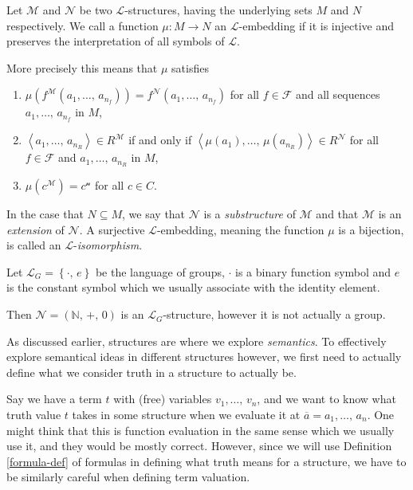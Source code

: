 \documentclass[../../main.tex]{subfiles}
\begin{document}
\begin{definition}\label{structure-embedding-def}\cite[Definition 1.1.3]{Mar02}
    Let $\mathcal{M}$ and $\mathcal{N}$ be two $\mathcal{L}$-structures, having the underlying sets $M$ and $N$ respectively.
    We call a function $\mu: M \to N$ an $\mathcal{L}$-embedding if it is injective and preserves the interpretation of all symbols of $\mathcal{L}$.

    More precisely this means that $\mu$ satisfies
    \begin{enumerate}[label=(\roman*)]
        \item $\mu\left(f^\mathcal{M}(a_1,\ldots,\, a_{n_f})\right) = f^\mathcal{N}(a_1,\ldots,\, a_{n_f})$ 
        for all $f \in \mathcal{F}$ and all sequences $a_1,\ldots,\, a_{n_f}$ in $M$,
        \item $\left<a_1,\ldots,\, a_{n_R}\right> \in R^\mathcal{M}$ if and only if $\left<\mu(a_1),\ldots,\, \mu(a_{n_R})\right> \in R^\mathcal{N}$ 
        for all $f \in \mathcal{F}$ and $a_1,\ldots,\, a_{n_R}$ in $M$,
        \item $\mu(c^\mathcal{M}) = c^\mathcal{n}$ for all $c \in C$.
    \end{enumerate}
    In the case that $N \subseteq M$, 
    we say that $\mathcal{N}$ is a \textit{substructure} of $\mathcal{M}$ and that $\mathcal{M}$ is an \textit{extension} of $\mathcal{N}$.
    A surjective $\mathcal{L}$-embedding, meaning the function $\mu$ is a bijection, is called an $\mathcal{L}$-\emph{isomorphism}.
\end{definition}

\begin{example}\cite[p.8]{Mar02}
    Let $\mathcal{L}_G = \left\{\cdot,\, e\right\}$ be the language of groups, 
    $\cdot$ is a binary function symbol and $e$ is the constant symbol which we usually associate with the identity element.

    Then $\mathcal{N} = \left(\mathbb{N},\, +,\, 0\right)$ is an $\mathcal{L}_G$-structure, however it is not actually a group.
\end{example}

As discussed earlier, structures are where we explore \textit{semantics}.
To effectively explore semantical ideas in different structures however, 
we first need to actually define what we consider truth in a structure to actually be.

Say we have a term $t$ with (free) variables $v_1,\ldots,\, v_n$,
and we want to know what truth value $t$ takes in some structure when we evaluate it at $\overline{a} = a_1,\ldots,\, a_n$.
One might think that this is function evaluation in the same sense which we usually use it, and they would be mostly correct.
However, since we will use Definition \ref{formula-def} of formulas in defining what truth means for a structure,
we have to be similarly careful when defining term valuation.
\end{document}
